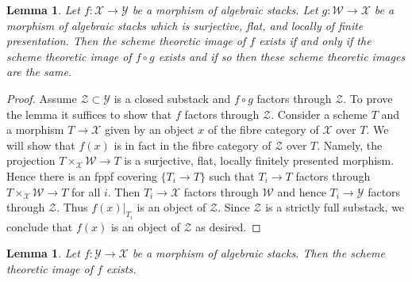 \documentclass{stacks-project}
\theoremstyle{plain}
\newtheorem{lemma}[subsection]{Lemma}
\theoremstyle{definition}
\theoremstyle{remark}
\numberwithin{equation}{subsection}
\begin{document}
\begin{lemma}
\label{lemma-cover-upstairs}
Let $f : \mathcal{X} \to \mathcal{Y}$ be a morphism of algebraic stacks.
Let $g : \mathcal{W} \to \mathcal{X}$ be a morphism of algebraic stacks
which is surjective, flat, and locally of finite presentation.
Then the scheme theoretic image of $f$ exists if and only if the
scheme theoretic image of $f \circ g$ exists and if so then these
scheme theoretic images are the same.
\end{lemma}

\begin{proof}
Assume $\mathcal{Z} \subset \mathcal{Y}$
is a closed substack and $f \circ g$ factors through $\mathcal{Z}$.
To prove the lemma it suffices to show
that $f$ factors through $\mathcal{Z}$.
Consider a scheme $T$ and a morphism $T \to \mathcal{X}$
given by an object $x$ of the fibre category of $\mathcal{X}$ over $T$.
We will show that $f(x)$ is in fact in the fibre category of $\mathcal{Z}$
over $T$. Namely, the projection $T \times_\mathcal{X} \mathcal{W} \to T$
is a surjective, flat, locally finitely presented morphism.
Hence there is an fppf covering $\{T_i \to T\}$ such that
$T_i \to T$ factors through $T \times_\mathcal{X} \mathcal{W} \to T$
for all $i$. Then $T_i \to \mathcal{X}$ factors through $\mathcal{W}$
and hence $T_i \to \mathcal{Y}$ factors through $\mathcal{Z}$.
Thus $f(x)|_{T_i}$ is an object of $\mathcal{Z}$.
Since $\mathcal{Z}$ is a strictly full substack, we conclude
that $f(x)$ is an object of $\mathcal{Z}$ as desired.
\end{proof}

\begin{lemma}
\label{lemma-scheme-theoretic-image-existence}
Let $f : \mathcal{Y} \to \mathcal{X}$ be a morphism of algebraic stacks.
Then the scheme theoretic image of $f$ exists.
\end{lemma}
\end{document}

